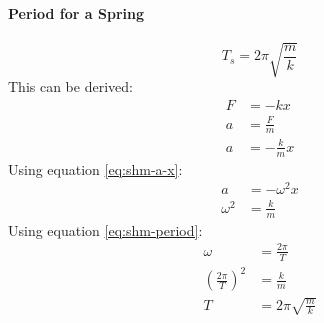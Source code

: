 \documentclass{article}
\begin{document}
            \paragraph{Period for a Spring}
            \begin{equation}
                T_s = 2 \pi \sqrt{\frac{m}{k}}
            \end{equation}
            This can be derived:
            \begin{align}
                F &= - k x \nonumber\\
                a &= \frac{F}{m} \nonumber\\
                a &= - \frac{k}{m} x \nonumber
            \end{align}
            Using equation \ref{eq:shm-a-x}:
            \begin{align}
                a &= - \omega^2 x \nonumber\\
                \omega^2 &= \frac{k}{m} \nonumber
            \end{align}
            Using equation \ref{eq:shm-period}:
            \begin{align}
                \omega &= \frac{2 \pi}{T} \nonumber\\
                \left( \frac{2 \pi}{T} \right)^2 &= \frac{k}{m} \nonumber\\
                T &= 2 \pi \sqrt{\frac{m}{k}} \nonumber
            \end{align}
\end{document}
